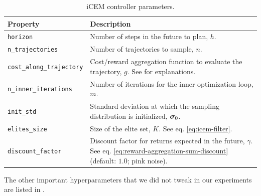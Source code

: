\begin{table}[H]
    \centering
    \begin{tabularx}{\textwidth}{C{4.7cm} L}
        \hline
        Property & Description\\
        \hline
        \texttt{horizon} & Number of steps in the future to plan, \(h\).\\
        \texttt{n\_trajectories} & Number of trajectories to sample, \(n\).\\
        \texttt{cost\_along\_trajectory} & Cost/reward aggregation function to evaluate the trajectory, \(g\). See  for explanations.\\
        \texttt{n\_inner\_iterations} & Number of iterations for the inner optimization loop, \(m\).\\
        \texttt{init\_std} & Standard deviation at which the sampling distribution is initialized, \(\bm{\sigma}_0\).\\
        \texttt{elites\_size} & Size of the elite set, \(K\). See eq. \eqref{eq:icem-filter}.\\
        \texttt{discount\_factor} & Discount factor for returns expected in the future, \(\gamma\). See eq. \eqref{eq:reward-aggregation-sum-discount} (default: \(1.0\); pink noise).\\ 
        \hline
    \end{tabularx}
    \caption{iCEM controller parameters.}
    \label{tab:icem-params}
\end{table}

The other important hyperparameters that we did not tweak in our experiments are listed in .


